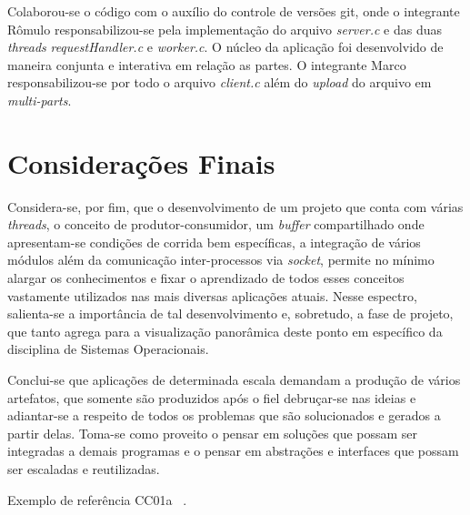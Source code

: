 \documentclass[12pt]{article}
\begin{document}
Colaborou-se o código com o auxílio do controle de versões git, onde o integrante Rômulo responsabilizou-se pela implementação do arquivo \emph{server.c} e das duas \emph{threads} \emph{requestHandler.c} e \emph{worker.c}. O núcleo da aplicação foi desenvolvido de maneira conjunta e interativa em relação as partes. O integrante Marco responsabilizou-se por todo o arquivo \emph{client.c} além do \textit{upload} do arquivo em \textit{multi-parts}.

\section{Considerações Finais}

Considera-se, por fim, que o desenvolvimento de um projeto que conta com várias \textit{threads}, o conceito de produtor-consumidor, um \textit{buffer} compartilhado onde apresentam-se condições de corrida bem específicas, a integração de vários módulos além da comunicação inter-processos via \textit{socket}, permite no mínimo alargar os conhecimentos e fixar o aprendizado de todos esses conceitos vastamente utilizados nas mais diversas aplicações atuais. Nesse espectro, salienta-se a importância de tal desenvolvimento e, sobretudo, a fase de projeto, que tanto agrega para a visualização panorâmica deste ponto em específico da disciplina de Sistemas Operacionais.

Conclui-se que aplicações de determinada escala demandam a produção de vários artefatos, que somente são produzidos após o fiel debruçar-se nas ideias e adiantar-se a respeito de todos os problemas que são solucionados e gerados a partir delas. Toma-se como proveito o pensar em soluções que possam ser integradas a demais programas e o pensar em abstrações e interfaces que possam ser escaladas e reutilizadas.

Exemplo de referência CC01a ~\cite{CC01}.

{}

\end{document}
